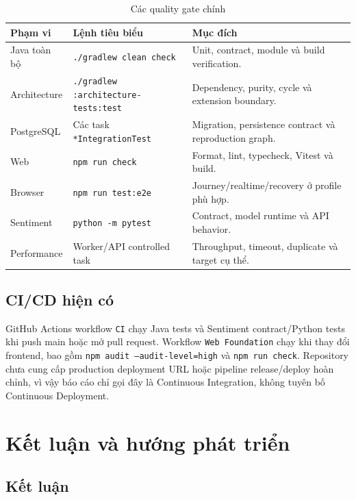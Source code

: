 \documentclass[12pt,a4paper,oneside]{report}
\begin{document}
\begin{table}[H]
  \centering
  \caption{Các quality gate chính}
  \label{tab:quality-gates}
  \small
  \begin{tabularx}{\textwidth}{L{3.2cm}L{6.5cm}Y}
    \toprule
    \textbf{Phạm vi} & \textbf{Lệnh tiêu biểu} & \textbf{Mục đích} \\
    \midrule
    Java toàn bộ & \texttt{./gradlew clean check} & Unit, contract, module và build verification. \\
    Architecture & \texttt{./gradlew :architecture-tests:test} & Dependency, purity, cycle và extension boundary. \\
    PostgreSQL & Các task \texttt{*IntegrationTest} & Migration, persistence contract và reproduction graph. \\
    Web & \texttt{npm run check} & Format, lint, typecheck, Vitest và build. \\
    Browser & \texttt{npm run test:e2e} & Journey/realtime/recovery ở profile phù hợp. \\
    Sentiment & \texttt{python -m pytest} & Contract, model runtime và API behavior. \\
    Performance & Worker/API controlled task & Throughput, timeout, duplicate và target cụ thể. \\
    \bottomrule
  \end{tabularx}
\end{table}

\section{CI/CD hiện có}

GitHub Actions workflow \texttt{CI} chạy Java tests và Sentiment contract/Python tests khi push main hoặc mở pull request. Workflow \texttt{Web Foundation} chạy khi thay đổi frontend, bao gồm \texttt{npm audit --audit-level=high} và \texttt{npm run check}. Repository chưa cung cấp production deployment URL hoặc pipeline release/deploy hoàn chỉnh, vì vậy báo cáo chỉ gọi đây là Continuous Integration, không tuyên bố Continuous Deployment.

\chapter{Kết luận và hướng phát triển}
\label{chap:conclusion}

\section{Kết luận}
\end{document}
